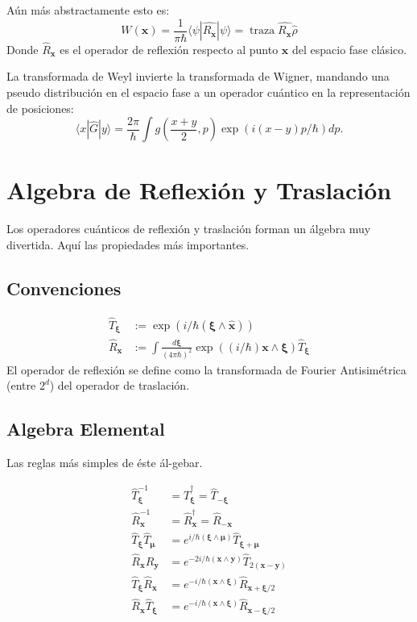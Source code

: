 \documentclass[a4paper,10pt]{article}
\newcommand{\xfase}{\mathbf{x}}
\newcommand{\yfase}{\mathbf{y}}
\newcommand{\xifase}{ {\boldsymbol{\xi}} }
\newcommand{\mufase}{ {\boldsymbol{\mu}} }
\newcommand{\bra}[1]{\langle #1|}
\newcommand{\ket}[1]{|#1\rangle}
\DeclareMathOperator*{\traza}{traza}
\begin{document}
Aún más abstractamente esto es:
\begin{equation}
W(\xfase)= \frac{1}{\pi\hbar}\bra{\psi}\hat{R_\xfase}\ket{\psi}
=\traza \hat{R_\xfase}\hat{\rho}
\end{equation}
Donde $\hat{R}_\xfase$ es el operador de reflexión
respecto al punto $\xfase$ del espacio fase clásico.

La transformada de Weyl invierte la transformada
de Wigner, mandando una pseudo distribución en el
espacio fase a un operador cuántico en la representación 
de posiciones:
\begin{equation}
\bra{x}\hat{G}\ket{y}=\frac{2 \pi}{\hbar} \int 
g\left(\frac{x+y}{2},p\right) \exp(i(x-y)p/\hbar) dp .
\end{equation}

\section{Algebra de Reflexión y Traslación}

Los operadores cuánticos de reflexión y traslación forman un
álgebra muy divertida. Aquí las propiedades más importantes.

\subsection{Convenciones}
\begin{equation}
 \begin{split}
\hat{T}_\xifase &:= \exp(i/\hbar (\xifase\wedge\hat{\xfase}))\\
\hat{R}_\xfase &:= \int \frac{d\xifase}{(4 \pi \hbar)^2}
\exp((i/\hbar) \xfase \wedge \xifase)\hat{T}_\xifase
 \end{split}
\end{equation}
 El operador de reflexión se define como la transformada
de Fourier Antisimétrica (entre $2^d$) del operador
de traslación.

\subsection{Algebra Elemental}

Las reglas más simples de éste ál-gebar.

\begin{equation}
\begin{split}
\hat{T}_\xifase^{-1}&=\hat{T}_\xifase^\dagger=\hat{T}_{-\xifase}\\
\hat{R}_\xfase^{-1}&=\hat{R}_\xfase^\dagger=\hat{R}_{-\xfase}\\
\hat{T}_\xifase\hat{T}_\mufase &=e^{i/\hbar(\xifase\wedge\mufase)} 
\hat{T}_{\xifase+\mufase}\\
\hat{R}_\xfase \hat{R}_\yfase &=e^{-2i/\hbar(\xfase\wedge\yfase)} 
\hat{T}_{2(\xfase-\yfase)}\\
\hat{T}_\xifase\hat{R}_\xfase &=e^{-i/\hbar(\xfase\wedge\xifase)} 
\hat{R}_{\xfase+\xifase/2}\\
 \hat{R}_\xfase\hat{T}_\xifase &=e^{-i/\hbar(\xfase\wedge\xifase)} 
\hat{R}_{\xfase-\xifase/2}\\
\end{split}
\end{equation}
\end{document}
